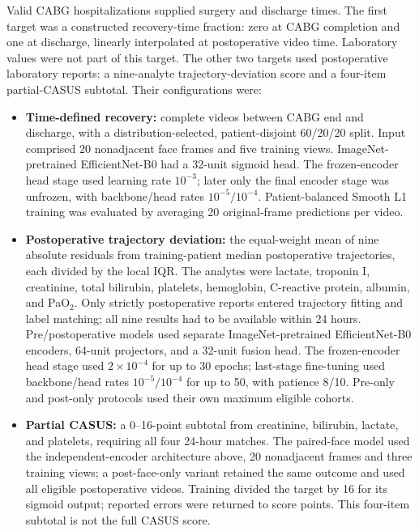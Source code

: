 \documentclass[10pt,a4paper]{article}
\begin{document}
Valid CABG hospitalizations supplied surgery and discharge times. The first target was a constructed recovery-time fraction: zero at CABG completion and one at discharge, linearly interpolated at postoperative video time. Laboratory values were not part of this target. The other two targets used postoperative laboratory reports: a nine-analyte trajectory-deviation score and a four-item partial-CASUS subtotal. Their configurations were:
\begin{itemize}
\setlength{\itemsep}{1pt}
\item \textbf{Time-defined recovery:} complete videos between CABG end and discharge, with a distribution-selected, patient-disjoint 60/20/20 split. Input comprised 20 nonadjacent face frames and five training views. ImageNet-pretrained EfficientNet-B0 had a 32-unit sigmoid head. The frozen-encoder head stage used learning rate $10^{-3}$; later only the final encoder stage was unfrozen, with backbone/head rates $10^{-5}/10^{-4}$. Patient-balanced Smooth L1 training was evaluated by averaging 20 original-frame predictions per video.
\item \textbf{Postoperative trajectory deviation:} the equal-weight mean of nine absolute residuals from training-patient median postoperative trajectories, each divided by the local IQR. The analytes were lactate, troponin I, creatinine, total bilirubin, platelets, hemoglobin, C-reactive protein, albumin, and PaO$_2$. Only strictly postoperative reports entered trajectory fitting and label matching; all nine results had to be available within 24 hours. Pre/postoperative models used separate ImageNet-pretrained EfficientNet-B0 encoders, 64-unit projectors, and a 32-unit fusion head. The frozen-encoder head stage used $2\times10^{-4}$ for up to 30 epochs; last-stage fine-tuning used backbone/head rates $10^{-5}/10^{-4}$ for up to 50, with patience 8/10. Pre-only and post-only protocols used their own maximum eligible cohorts.
\item \textbf{Partial CASUS:} a 0--16-point subtotal from creatinine, bilirubin, lactate, and platelets, requiring all four 24-hour matches. The paired-face model used the independent-encoder architecture above, 20 nonadjacent frames and three training views; a post-face-only variant retained the same outcome and used all eligible postoperative videos. Training divided the target by 16 for its sigmoid output; reported errors were returned to score points. This four-item subtotal is not the full CASUS score.
\end{itemize}
\end{document}
